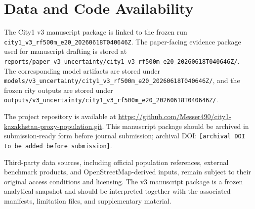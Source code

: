 \section{Data and Code Availability}

The City1 v3 manuscript package is linked to the frozen run \texttt{city1\_v3\_rf500m\_e20\_20260618T040646Z}. The paper-facing evidence package used for manuscript drafting is stored at \texttt{reports/paper\_v3\_uncertainty/city1\_v3\_rf500m\_e20\_20260618T040646Z/}. The corresponding model artifacts are stored under \texttt{models/v3\_uncertainty/city1\_v3\_rf500m\_e20\_20260618T040646Z/}, and the frozen city outputs are stored under \texttt{outputs/v3\_uncertainty/city1\_v3\_rf500m\_e20\_20260618T040646Z/}.

The project repository is available at \url{https://github.com/Messer490/city1-kazakhstan-proxy-population.git}. This manuscript package should be archived in submission-ready form before journal submission; archival DOI: \texttt{[archival DOI to be added before submission]}.

Third-party data sources, including official population references, external benchmark products, and OpenStreetMap-derived inputs, remain subject to their original access conditions and licensing. The v3 manuscript package is a frozen analytical snapshot and should be interpreted together with the associated manifests, limitation files, and supplementary material.

